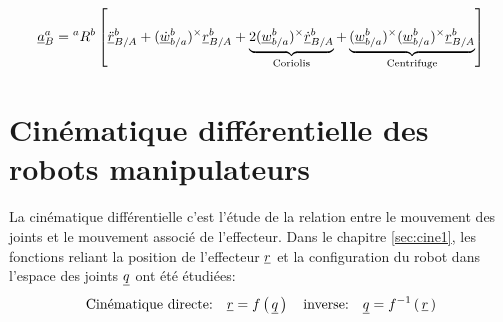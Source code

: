\begin{align}
\underline{a}_{B}^{a} 
= 
{}^{a}R^b \left[ 
\underline{\ddot{r}}^b_{B/A}
+ 
(\underline{\dot{w}}_{b/a}^b)^{\times} \underline{r}^b_{B/A}  
+
\underbrace{
2 (\underline{w}_{b/a}^b)^{\times} \underline{\dot{r}}^b_{B/A}  
}_{\text{Coriolis}}
+
\underbrace{
(\underline{w}_{b/a}^b)^{\times} (\underline{w}_{b/a}^b)^{\times} \underline{r}^b_{B/A}  
}_{\text{Centrifuge}}
\right] 
\end{align}





\newpage
\section{Cinématique différentielle des robots manipulateurs}
\label{sec:differentialkinematicmanipulators}


La cinématique différentielle c'est l'étude de la relation entre le mouvement des joints et le mouvement associé de l'effecteur. Dans le chapitre \ref{sec:cine1}, les fonctions reliant la position de l'effecteur $\underline{r}$ et la configuration du robot dans l'espace des joints $\underline{q}$ ont été étudiées:
\begin{equation}
\text{Cinématique directe:}  \quad \underline{r} = f\left( \, \underline{q} \, \right)  \quad  \text{inverse:} \quad \underline{q} = f^{-1}\left( \, \underline{r}  \, \right) 
\end{equation}

